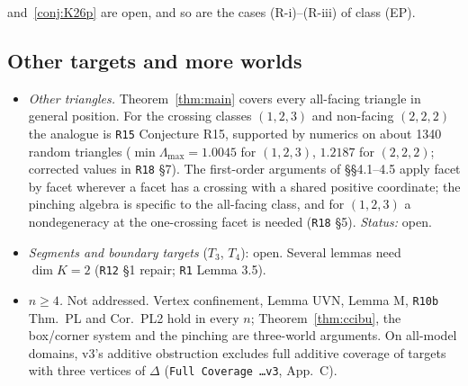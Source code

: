 \documentclass[11pt]{article}
\theoremstyle{definition}
\theoremstyle{remark}
\newcommand{\src}[1]{\texttt{#1}}
\begin{document}
and~\ref{conj:K26p} are open, and so are the cases (R-i)--(R-iii) of class (EP).

\subsection{Other targets and more worlds}\label{sec:open-other}
\begin{itemize}[leftmargin=*]
\item \emph{Other triangles.} Theorem~\ref{thm:main} covers every all-facing triangle in general position. For the crossing classes $(1,2,3)$ and non-facing $(2,2,2)$ the analogue is \src{R15} Conjecture R15, supported by numerics on about 1340 random triangles ($\min\Lambda_{\max}=1.0045$ for $(1,2,3)$, $1.2187$ for $(2,2,2)$; corrected values in \src{R18} \S7). The first-order arguments of \S\S4.1--4.5 apply facet by facet wherever a facet has a crossing with a shared positive coordinate; the pinching algebra is specific to the all-facing class, and for $(1,2,3)$ a nondegeneracy at the one-crossing facet is needed (\src{R18} \S5). \emph{Status:} open.
\item \emph{Segments and boundary targets} ($T_3$, $T_4$): open. Several lemmas need $\dim K=2$ (\src{R12} \S1 repair; \src{R1} Lemma 3.5).
\item \emph{$n\ge4$.} Not addressed. Vertex confinement, Lemma UVN, Lemma M, \src{R10b} Thm.~PL and Cor.~PL2 hold in every $n$; Theorem~\ref{thm:ccibu}, the box/corner system and the pinching are three-world arguments. On all-model domains, v3's additive obstruction excludes full additive coverage of targets with three vertices of $\Delta$ (\src{Full Coverage \dots v3}, App.~C).
\end{itemize}
\end{document}

